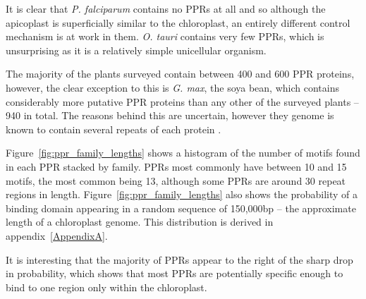 It is clear that \emph{P. falciparum} contains no PPRs at all and so
although the apicoplast is superficially similar to the chloroplast, 
an entirely different control mechanism is at work in them.
\emph{O. tauri} contains very few PPRs, which is unsurprising as it is a
relatively simple unicellular organism.

The majority of the plants surveyed contain between 400 and 600 PPR proteins,
however, the clear exception to this is \emph{G. max}, the soya bean, 
which contains considerably more putative PPR proteins than any other of the 
surveyed plants -- 940 in total.
The reasons behind this are uncertain, however they genome is known to contain
several repeats of each protein \citep{Schmutz2010}.

Figure~\ref{fig:ppr_family_lengths} shows a histogram of the number of motifs
found in each PPR stacked by family.
PPRs most commonly have between 10 and 15 motifs, the most common being 13, 
although some PPRs are around 30 repeat regions in length.
Figure~\ref{fig:ppr_family_lengths} also shows the probability of a binding
domain appearing in a random sequence of 150,000bp -- the approximate length of
a chloroplast genome.
This distribution is derived in appendix~\ref{AppendixA}.

It is interesting that the majority of PPRs appear to the right of the sharp
drop in probability, which shows that most PPRs are potentially specific enough
to bind to one region only within the chloroplast.

